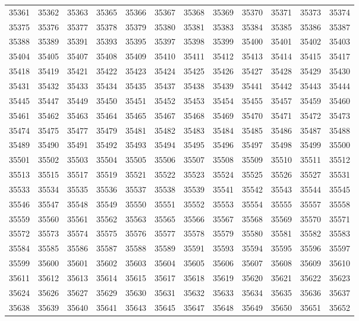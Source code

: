 \begin{center}
\begin{longtable}{llllllllllll}
35361 &35362 &35363 &35365 &35366 &35367 &35368 &35369 &35370 &35371 &35373 &35374 \\
35375 &35376 &35377 &35378 &35379 &35380 &35381 &35383 &35384 &35385 &35386 &35387 \\
35388 &35389 &35391 &35393 &35395 &35397 &35398 &35399 &35400 &35401 &35402 &35403 \\
35404 &35405 &35407 &35408 &35409 &35410 &35411 &35412 &35413 &35414 &35415 &35417 \\
35418 &35419 &35421 &35422 &35423 &35424 &35425 &35426 &35427 &35428 &35429 &35430 \\
35431 &35432 &35433 &35434 &35435 &35437 &35438 &35439 &35441 &35442 &35443 &35444 \\
35445 &35447 &35449 &35450 &35451 &35452 &35453 &35454 &35455 &35457 &35459 &35460 \\
35461 &35462 &35463 &35464 &35465 &35467 &35468 &35469 &35470 &35471 &35472 &35473 \\
35474 &35475 &35477 &35479 &35481 &35482 &35483 &35484 &35485 &35486 &35487 &35488 \\
35489 &35490 &35491 &35492 &35493 &35494 &35495 &35496 &35497 &35498 &35499 &35500 \\
35501 &35502 &35503 &35504 &35505 &35506 &35507 &35508 &35509 &35510 &35511 &35512 \\
35513 &35515 &35517 &35519 &35521 &35522 &35523 &35524 &35525 &35526 &35527 &35531 \\
35533 &35534 &35535 &35536 &35537 &35538 &35539 &35541 &35542 &35543 &35544 &35545 \\
35546 &35547 &35548 &35549 &35550 &35551 &35552 &35553 &35554 &35555 &35557 &35558 \\
35559 &35560 &35561 &35562 &35563 &35565 &35566 &35567 &35568 &35569 &35570 &35571 \\
35572 &35573 &35574 &35575 &35576 &35577 &35578 &35579 &35580 &35581 &35582 &35583 \\
35584 &35585 &35586 &35587 &35588 &35589 &35591 &35593 &35594 &35595 &35596 &35597 \\
35599 &35600 &35601 &35602 &35603 &35604 &35605 &35606 &35607 &35608 &35609 &35610 \\
35611 &35612 &35613 &35614 &35615 &35617 &35618 &35619 &35620 &35621 &35622 &35623 \\
35624 &35626 &35627 &35629 &35630 &35631 &35632 &35633 &35634 &35635 &35636 &35637 \\
35638 &35639 &35640 &35641 &35643 &35645 &35647 &35648 &35649 &35650 &35651 &35652 \\

\end{longtable}
\end{center}
